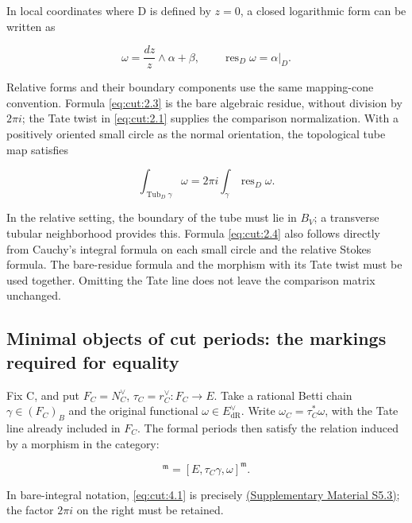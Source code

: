 \documentclass[11pt,a4paper,oneside]{article}
\theoremstyle{plain}
\theoremstyle{definition}
\theoremstyle{remark}
\numberwithin{equation}{section}
\newcommand{\otherref}[2]{\href{#1.pdf}{#2}}
\begin{document}
In local coordinates where D is defined by \(z=0\), a closed logarithmic form can be written as

\begin{equation}
\omega=\frac{dz}{z}\wedge\alpha+\beta,
 \qquad\operatorname{res}_D\omega=\alpha|_D.           \label{eq:cut:2.3}
\end{equation}

Relative forms and their boundary components use the same mapping-cone convention. Formula \eqref{eq:cut:2.3} is the bare algebraic residue, without division by \(2\pi i\); the Tate twist in \eqref{eq:cut:2.1} supplies the comparison normalization. With a positively oriented small circle as the normal orientation, the topological tube map satisfies

\begin{equation}
\int_{\operatorname{Tub}_D\gamma}\omega
       =2\pi i\int_\gamma\operatorname{res}_D\omega.   \label{eq:cut:2.4}
\end{equation}

In the relative setting, the boundary of the tube must lie in \(B_V\); a transverse tubular neighborhood provides this. Formula \eqref{eq:cut:2.4} also follows directly from Cauchy's integral formula on each small circle and the relative Stokes formula. The bare-residue formula and the morphism with its Tate twist must be used together. Omitting the Tate line does not leave the comparison matrix unchanged.


\subsection{Minimal objects of cut periods: the markings required for equality}\label{sec:cut:4}

Fix C, and put \(F_C=N_C^\vee \), \(\tau _C=r_C^\vee :F_C\to E\). Take a rational Betti chain \(\gamma \in (F_C)_B\) and the original functional \(\omega \in E_{\mathrm{dR}}^\vee \). Write \(\omega _C=\tau _C^\ast \omega \), with the Tate line already included in \(F_C\). The formal periods then satisfy the relation induced by a morphism in the category:

\begin{equation}
[F_C,\gamma,\omega_C]^{\mathfrak m}
       =[E,\tau_C\gamma,\omega]^{\mathfrak m}.         \label{eq:cut:4.1}
\end{equation}

In bare-integral notation, \eqref{eq:cut:4.1} is precisely \otherref{feynman_periods_supplement_en}{(Supplementary Material S5.3)}; the factor \(2\pi i\) on the right must be retained.
\end{document}
